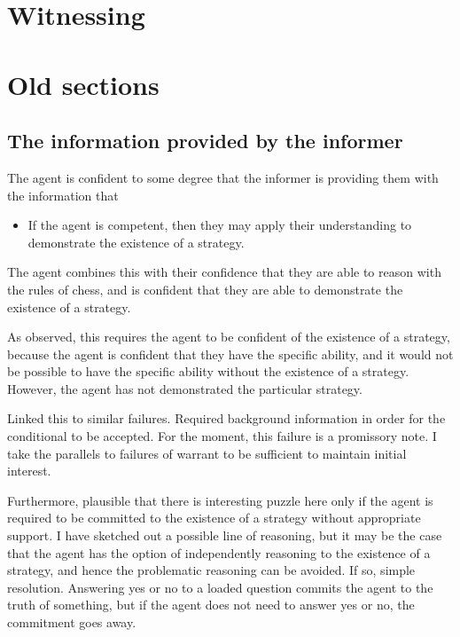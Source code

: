 \documentclass[10pt]{article}
\newcommand{\hozlinedash}[0]{%
  \noindent\hdashrule[0.5ex][c]{\textwidth}{.1pt}{2.5pt}
}
\begin{document}
\newpage

\section{Witnessing}
\label{sec:witnessing}



\section*{Old sections}
\label{sec:old-sections}


\subsection{The information provided by the informer}
\label{sec:inform-prov-inform}


The agent is confident to some degree that the informer is providing them with the information that
\begin{itemize}
\item If the agent is competent, then they may apply their understanding to demonstrate the existence of a strategy.
\end{itemize}
The agent combines this with their confidence that they are able to reason with the rules of chess, and is confident that they are able to demonstrate the existence of a strategy.

As observed, this requires the agent to be confident of the existence of a strategy, because the agent is confident that they have the specific ability, and it would not be possible to have the specific ability without the existence of a strategy.
However, the agent has not demonstrated the particular strategy.

\hozlinedash

Linked this to similar failures.
Required background information in order for the conditional to be accepted.
For the moment, this failure is a promissory note.
I take the parallels to failures of warrant to be sufficient to maintain initial interest.

\hozlinedash

Furthermore, plausible that there is interesting puzzle here only if the agent is required to be committed to the existence of a strategy without appropriate support.
I have sketched out a possible line of reasoning, but it may be the case that the agent has the option of independently reasoning to the existence of a strategy, and hence the problematic reasoning can be avoided.
If so, simple resolution.
Answering yes or no to a loaded question commits the agent to the truth of something, but if the agent does not need to answer yes or no, the commitment goes away.
\end{document}
